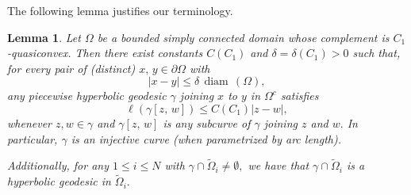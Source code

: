 \documentclass[reqno,11pt]{amsart}
\makeatletter
\def\dist{{\mathop\mathrm{\,dist\,}}}
\def\wz{\widetilde}
\def\diam{{\mathop\mathrm{\,diam\,}}}
\newtheorem{lem}[thm]{Lemma}%
\numberwithin{equation}{section}
\theoremstyle{remark}
\makeatother
\begin{document}

The following lemma justifies our terminology. 

\begin{lem}\label{lem_phg}
 Let $\Omega$ be a bounded simply connected domain whose complement is 
$C_1$-quasiconvex. Then there exist constants $C(C_1)$
and $\delta=\delta(C_1)>0$ 
such that, 
 for every pair of (distinct) $x,\,y\in \partial\Omega$
with
\begin{equation}\label{equ 300}
|x-y|\le \delta \diam(\Omega), 
\end{equation}
any piecewise hyperbolic geodesic
 $\gamma$ joining $x$ to $y$ in $\Omega^c$ satisfies
 \[
  \ell(\gamma[z,\,w])\leq C(C_1) |z-w|,
 \]
whenever $z,w\in \gamma$ and $\gamma[z,\,w]$ is any subcurve of $\gamma$ 
joining $z$ and $w.$
In particular, $\gamma$ is an injective curve (when parametrized by arc length).

Additionally, for any $1\le i\le N$ with $\gamma\cap \wz\Omega_i\neq\emptyset,$
we have that  $\gamma\cap \wz\Omega_i$ is a hyperbolic 
geodesic in $\wz\Omega_i.$ 
\end{lem}
\end{document}
